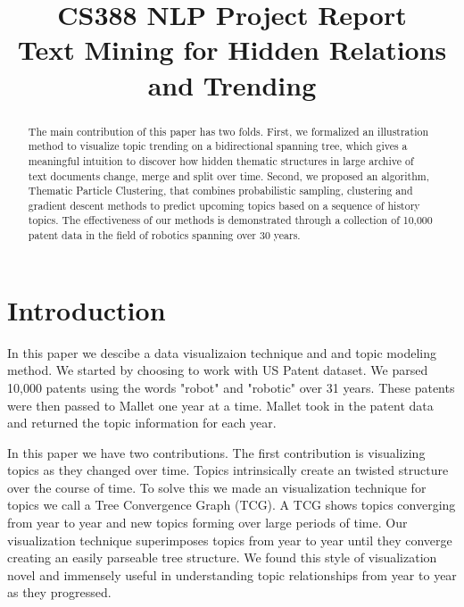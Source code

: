 \documentclass[conference]{IEEEtran}
\begin{document}
\title{\large{CS388 NLP Project Report}\\ \huge{Text Mining for Hidden Relations and Trending}}

\author{
\and
{}
}
\maketitle
\onehalfspace
\begin{abstract}
The main contribution of this paper has two folds. First, we formalized an illustration method to visualize topic trending on a bidirectional spanning tree, which gives a meaningful intuition to discover how hidden thematic structures in large archive of text documents change, merge and split over time. Second, we proposed an algorithm, Thematic Particle Clustering, that combines probabilistic sampling, clustering and gradient descent methods to predict upcoming topics based on a sequence of history topics. The effectiveness of our methods is demonstrated through a collection of 10,000 patent data in the field of robotics spanning over 30 years.
\end{abstract}

\section{Introduction}
In this paper we descibe a data visualizaion technique and and topic modeling method. We started by choosing to work with US Patent dataset. We parsed 10,000 patents using the words "robot" and "robotic" over 31 years. These patents were then passed to Mallet \cite{mallet} one year at a time. Mallet took in the patent data and returned the topic information for each year.

In this paper we have two contributions. The first contribution is visualizing topics as they changed over time. Topics intrinsically create an twisted structure over the course of time. To solve this we made an visualization technique for topics we call a Tree Convergence Graph (TCG). A TCG shows topics converging from year to year and new topics forming over large periods of time. Our visualization technique superimposes topics from year to year until they converge creating an easily parseable tree structure. We found this style of visualization novel and immensely useful in understanding topic relationships from year to year as they progressed. 
\end{document}
